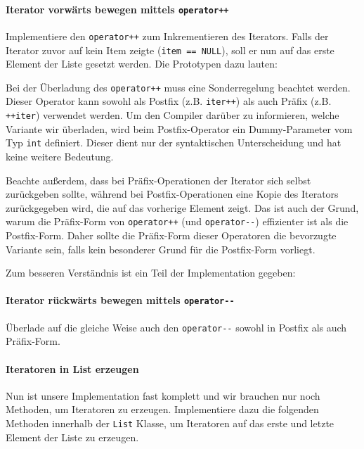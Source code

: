

\paragraph{Iterator vorwärts bewegen mittels \lstinline{operator++}}

Implementiere den \lstinline{operator++} zum Inkrementieren des Iterators.
Falls der Iterator zuvor auf kein Item zeigte (\lstinline{item == NULL}), soll er nun auf das erste Element der Liste gesetzt werden.
Die Prototypen dazu lauten:



Bei der Überladung des \lstinline{operator++} muss eine Sonderregelung beachtet werden.
Dieser Operator kann sowohl als Postfix (z.B. \lstinline{iter++}) als auch Präfix (z.B. \lstinline{++iter}) verwendet werden.
Um den Compiler darüber zu informieren, welche Variante wir überladen, wird beim Postfix-Operator ein Dummy-Parameter vom Typ \lstinline{int} definiert.
Dieser dient nur der syntaktischen Unterscheidung und hat keine weitere Bedeutung.

Beachte außerdem, dass bei Präfix-Operationen der Iterator sich selbst zurückgeben sollte, während bei Postfix-Operationen eine Kopie des Iterators zurückgegeben wird, die auf das vorherige Element zeigt.
Das ist auch der Grund, warum die Präfix-Form von \lstinline{operator++} (und \lstinline{operator--}) effizienter ist als die Postfix-Form.
Daher sollte die Präfix-Form dieser Operatoren die bevorzugte Variante sein, falls kein besonderer Grund für die Postfix-Form vorliegt.

Zum besseren Verständnis ist ein Teil der Implementation gegeben:



\paragraph{Iterator rückwärts bewegen mittels \lstinline{operator--}}
Überlade auf die gleiche Weise auch den \lstinline{operator--} sowohl in Postfix als auch Präfix-Form.

\paragraph{Iteratoren in List erzeugen} 
Nun ist unsere Implementation fast komplett und wir brauchen nur noch Methoden, um Iteratoren zu erzeugen.
Implementiere dazu die folgenden Methoden innerhalb der \lstinline{List} Klasse, um Iteratoren auf das erste und letzte Element der Liste zu erzeugen.

